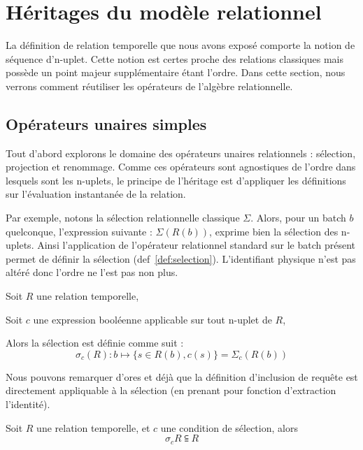 \section{Héritages du modèle relationnel}
La définition de relation temporelle que nous avons exposé comporte la notion de séquence d'n-uplet. Cette notion est certes proche des relations classiques mais possède un point majeur supplémentaire étant l'ordre. Dans cette section, nous verrons comment réutiliser les opérateurs de l'algèbre relationnelle.

\subsection{Opérateurs unaires simples}
Tout d'abord explorons le domaine des opérateurs unaires relationnels : sélection, projection et renommage. Comme ces opérateurs sont agnostiques de l'ordre dans lesquels sont les n-uplets, le principe de l'héritage est d'appliquer les définitions sur l'évaluation instantanée de la relation.

Par exemple, notons la sélection relationnelle classique $\Sigma$. Alors, pour un batch $b$ quelconque, l'expression suivante : $\Sigma(R(b))$, exprime bien la sélection des n-uplets. Ainsi l'application de l'opérateur relationnel standard sur le batch présent permet de définir la sélection (def~\ref{def:selection}). L'identifiant physique n'est pas altéré donc l'ordre ne l'est pas non plus.
\begin{defi}[Sélection]\label{def:selection}
Soit $R$ une relation temporelle,

Soit $c$ une expression booléenne applicable sur tout n-uplet de $R$,

Alors la sélection est définie comme suit :
$$\sigma_{c}(R) : b \mapsto \{s\in R(b), c(s)\} = \Sigma_c(R(b))$$
\end{defi}

Nous pouvons remarquer d'ores et déjà que la définition d'inclusion de requête est directement appliquable à la sélection (en prenant pour fonction d'extraction l'identité).
\begin{prop}
Soit $R$ une relation temporelle, et $c$ une condition de sélection, alors $$\sigma_c R \subseteqq R$$
\end{prop}

